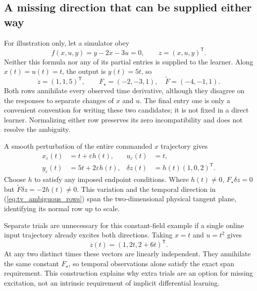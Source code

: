 \subsection{A missing direction that can be supplied either way}
For illustration only, let a simulator obey
\begin{equation}
 f(x,u,y)=y-2x-3u=0,\qquad z=(x,u,y)^{\mathsf T}.
 \label{eq:tv_linear_example}
\end{equation}
Neither this formula nor any of its partial entries is supplied to the
learner. Along $x(t)=u(t)=t$, the output is $y(t)=5t$, so
\begin{equation}
 \dot z=(1,1,5)^{\mathsf T},\qquad
 F_\star=(-2,-3,1),\quad \widetilde F=(-4,-1,1).
 \label{eq:tv_ambiguous_rows}
\end{equation}
Both rows annihilate every observed time derivative, although they disagree
on the responses to separate changes of $x$ and $u$. The final entry one is
only a convenient convention for writing these two candidates; it is not
fixed in a direct learner. Normalizing either row preserves its zero
incompatibility and does not resolve the ambiguity.

A smooth perturbation of the entire commanded $x$ trajectory gives
\begin{equation}
 \begin{aligned}
 x_\varepsilon(t)&=t+\varepsilon h(t),&u_\varepsilon(t)&=t,\\
 y_\varepsilon(t)&=5t+2\varepsilon h(t),&
 \delta z(t)&=h(t)(1,0,2)^{\mathsf T}.
 \end{aligned}
 \label{eq:tv_linear_trial}
\end{equation}
Choose $h$ to satisfy any imposed endpoint conditions. Where $h(t)\ne0$,
$F_\star\delta z=0$ but $\widetilde F\delta z=-2h(t)\ne0$.
This variation and the temporal direction in
(\ref{eq:tv_ambiguous_rows}) span the two-dimensional physical tangent
plane, identifying its normal row up to scale.

Separate trials are unnecessary for this constant-field example if a single
online input trajectory already excites both directions. Taking $x=t$ and
$u=t^2$ gives
\begin{equation}
 \dot z(t)=(1,2t,2+6t)^{\mathsf T}.
 \label{eq:tv_online_excitation}
\end{equation}
At any two distinct times these vectors are linearly independent. They
annihilate the same constant $F_\star$, so temporal observations alone
satisfy the exact span requirement. This construction explains why extra
trials are an option for missing excitation, not an intrinsic requirement
of implicit differential learning.

